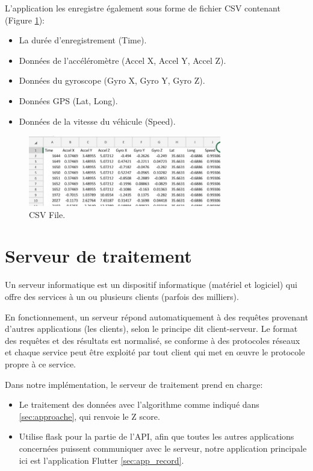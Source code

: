 \begin{itemize}
          

          L'application les enregistre également sous forme de fichier CSV contenant  (Figure \ref{fig:csv}):
          \begin{itemize}
              \item La durée d'enregistrement (Time).
              \item Données de l'accéléromètre (Accel X, Accel Y, Accel Z).
              \item Données du gyroscope (Gyro X, Gyro Y, Gyro Z).
              \item Données GPS (Lat, Long).
              \item Données de la vitesse du véhicule (Speed).
          \end{itemize}
          
\begin{figure}[h!]
        \center
        \includegraphics[width=0.75\textwidth]{Images/recordingApp/csv.jpg}
        \caption{CSV File.}
        \label{fig:csv}
    \end{figure}


\end{itemize}

\newpage

\section{Serveur de traitement}
Un serveur informatique est un dispositif informatique (matériel et logiciel) qui offre des services à un ou plusieurs clients (parfois des milliers).


En fonctionnement, un serveur répond automatiquement à des requêtes provenant d'autres applications (les clients), selon le principe dit client-serveur. Le format des requêtes et des résultats est normalisé, se conforme à des protocoles réseaux et chaque service peut être exploité par tout client qui met en œuvre le protocole propre à ce service.

Dans notre implémentation, le serveur de traitement prend en charge:
\renewcommand{\labelitemi}{$\bullet$}
\begin{itemize}
    \item Le traitement des données avec l'algorithme comme indiqué dans \ref{sec:approache}, qui renvoie le Z score. 
    \item Utilise flask pour la partie de l'API, afin que toutes les autres applications concernées puissent communiquer avec le serveur, notre application principale ici est l'application Flutter \ref{sec:app_record}.
\end{itemize}
